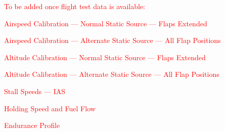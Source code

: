 \clearpage

\textcolor{red}{To be added once flight test data is available:
\begin{enumerate*}
\item Airspeed Calibration --- Normal Static Source --- Flaps Extended
\item Airspeed Calibration --- Alternate Static Source --- All Flap Positions
\item Altitude Calibration --- Normal Static Source --- Flaps Extended
\item Altitude Calibration --- Alternate Static Source --- All Flap Positions
\item Stall Speeds --- IAS
\item Holding Speed and Fuel Flow
\item Endurance Profile
\end{enumerate*}}
\cleardoublepage
